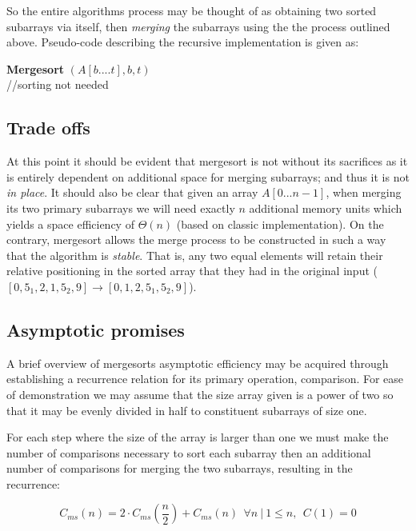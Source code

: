 \documentclass[11pt,letterpaper]{report}
\begin{document}
So the entire algorithms process may be thought of as obtaining two sorted subarrays via itself, then \emph{merging} the subarrays using the the process outlined above. Pseudo-code describing the recursive implementation is given as:

\begin{algorithm}[H]
\textbf{Mergesort} $(A[b....t], b, t)$ \\
   {//sorting not needed}
\end{algorithm}

\subsection*{Trade offs}
At this point it should be evident that mergesort is not without its sacrifices as it is entirely dependent on additional space for merging subarrays; and thus it is not \emph{in place}. It should also be clear that given an array $A[0...n-1]$, when merging its two primary subarrays we will need exactly $n$ additional memory units which yields a space efficiency of $\Theta(n)$ (based on classic implementation). On the contrary, mergesort allows the merge process to be constructed in such a way that the algorithm is \emph{stable}. That is, any two equal elements will retain their relative positioning in the sorted array that they had in the original input ($[0,5_1,2,1,5_2,9] \rightarrow [0,1,2,5_1,5_2,9]$).

\subsection*{Asymptotic promises}
A brief overview of mergesorts asymptotic efficiency may be acquired through establishing a recurrence relation for its primary operation, comparison. For ease of demonstration we may assume that the size array given is a power of two so that it may be evenly divided in half to constituent subarrays of size one. 

For each step where the size of the array is larger than one we must make the number of comparisons necessary to sort each subarray then an additional number of comparisons for merging the two subarrays, resulting in the recurrence: 

\begin{equation} 
C_{ms}(n)=2 \cdot C_{ms}(\frac{n}{2})+C_{ms}(n) \ \ \forall n~ | \ 1 \leq n, \ \ C(1) = 0 
\end{equation}
\end{document}
